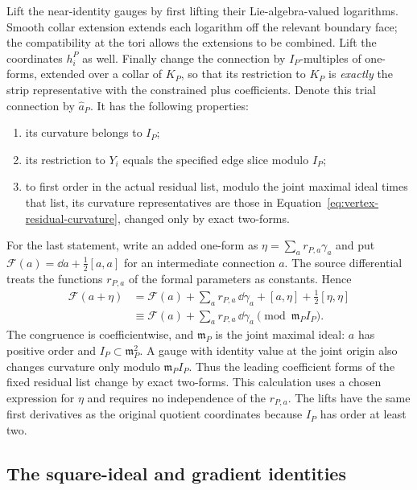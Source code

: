 Lift the near-identity gauges by first lifting their Lie-algebra-valued
logarithms.  Smooth collar extension extends each logarithm off the
relevant boundary face; the compatibility at the tori allows the
extensions to be combined.  Lift the coordinates $h_i^P$ as well.
Finally change the connection by $I_P$-multiples of one-forms, extended
over a collar of $K_P$, so that its restriction to $K_P$ is
\emph{exactly} the strip representative with the constrained plus
coefficients.  Denote this trial connection by $\widehat a_P$.  It has
the following properties:
\begin{enumerate}
\item its curvature belongs to $I_P$;
\item its restriction to $Y_i$ equals the specified edge slice modulo
      $I_P$;
\item to first order in the actual residual list, modulo the joint
      maximal ideal times that list, its curvature representatives are
      those in Equation~\eqref{eq:vertex-residual-curvature}, changed only by
      exact two-forms.
\end{enumerate}
For the last statement, write an added one-form as
$\eta=\sum_a r_{P,a}\gamma_a$ and put
$\mathcal F(a)=\dd a+\tfrac12[a,a]$ for an intermediate connection $a$.
The source differential treats the
functions $r_{P,a}$ of the formal parameters as constants.  Hence
\[
\begin{aligned}
 \mathcal F(a+\eta)
 &=\mathcal F(a)+\sum_a r_{P,a}\,\dd\gamma_a
                  +[a,\eta]+\tfrac12[\eta,\eta]\\
 &\equiv\mathcal F(a)+\sum_a r_{P,a}\,\dd\gamma_a
                  \pmod{\mathfrak m_P I_P}.
\end{aligned}
\]
The congruence is coefficientwise, and $\mathfrak m_P$ is the joint
maximal ideal: $a$ has positive
order and $I_P\subset\mathfrak m_P^2$.  A gauge with identity value
at the joint origin also changes curvature only modulo
$\mathfrak m_PI_P$.  Thus the leading coefficient forms of the fixed
residual list change by exact two-forms.  This calculation uses a
chosen expression for $\eta$ and requires no independence of the
$r_{P,a}$.  The lifts have the same first derivatives as the original
quotient coordinates because $I_P$ has order at least two.

\subsection{The square-ideal and gradient identities}

